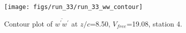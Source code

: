 \begin{figure}[H]
\centering
\texttt{[image: figs/run\_33/run\_33\_ww\_contour]}
\caption{Contour plot of $\overline{w^\prime w^\prime}$ at $z/c$=8.50, $V_{free}$=19.08, station 4.}
\label{fig:run_33_ww_contour}
\end{figure}


